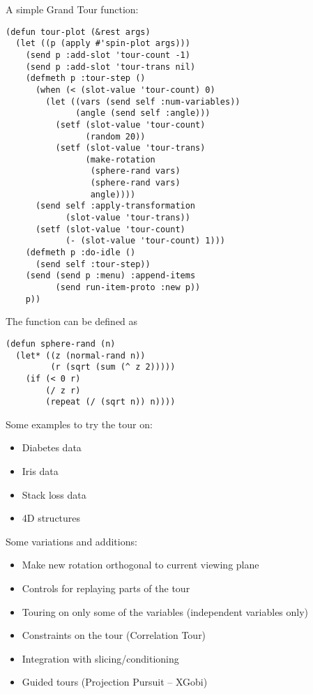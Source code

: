 \begin{slide}{}
A simple Grand Tour function:
{\Large
\begin{verbatim}
(defun tour-plot (&rest args)
  (let ((p (apply #'spin-plot args)))
    (send p :add-slot 'tour-count -1)
    (send p :add-slot 'tour-trans nil)
    (defmeth p :tour-step ()
      (when (< (slot-value 'tour-count) 0)
        (let ((vars (send self :num-variables))
              (angle (send self :angle)))
          (setf (slot-value 'tour-count)
                (random 20))
          (setf (slot-value 'tour-trans) 
                (make-rotation
                 (sphere-rand vars) 
                 (sphere-rand vars)
                 angle))))
      (send self :apply-transformation
            (slot-value 'tour-trans))
      (setf (slot-value 'tour-count)
            (- (slot-value 'tour-count) 1)))
    (defmeth p :do-idle ()
      (send self :tour-step))
    (send (send p :menu) :append-items
          (send run-item-proto :new p))
    p))
\end{verbatim}}
\end{slide}

\begin{slide}{}
The  function can be defined as
{\Large
\begin{verbatim}
(defun sphere-rand (n)
  (let* ((z (normal-rand n))
         (r (sqrt (sum (^ z 2)))))
    (if (< 0 r)
        (/ z r)
        (repeat (/ (sqrt n)) n))))
\end{verbatim}}
Some examples to try the tour on:
\begin{itemize}
\item Diabetes data
\item Iris data
\item Stack loss data
\item 4D structures
\end{itemize}
\end{slide}

\begin{slide}{}
Some variations and additions:
\begin{itemize}
\item Make new rotation orthogonal to current viewing plane
\item Controls for replaying parts of the tour
\item Touring on only some of the variables (independent variables only)
\item Constraints on the tour (Correlation Tour)
\item Integration with slicing/conditioning
\item Guided tours (Projection Pursuit -- XGobi)
\end{itemize}
\end{slide}


